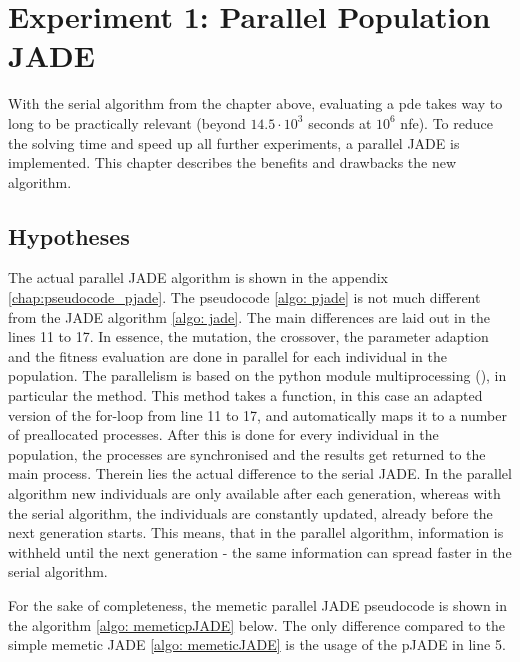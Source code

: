 \documentclass[./\jobname.tex]{subfiles}
\begin{document}
\chapter {Experiment 1: Parallel Population JADE}
\label{chap:experimet_1}

With the serial algorithm from the chapter above, evaluating a \gls{pde} takes way to long to be practically relevant (beyond $14.5 \cdot 10^3$ seconds at $10^6$ \gls{nfe}). To reduce the solving time and speed up all further experiments, a parallel JADE is implemented. This chapter describes the benefits and drawbacks the new algorithm.  

\section{Hypotheses}
The actual parallel JADE algorithm is shown in the appendix \ref{chap:pseudocode_pjade}. The pseudocode \ref{algo: pjade} is not much different from the JADE algorithm \ref{algo: jade}. The main differences are laid out in the lines 11 to 17. In essence, the mutation, the crossover, the parameter adaption and the fitness evaluation are done in parallel for each individual in the population. The parallelism is based on the python module multiprocessing (\cite{python_standard_library_multiprocessing_2020}), in particular the  method. This method takes a function, in this case an adapted version of the for-loop from line 11 to 17, and automatically maps it to a number of preallocated processes. After this is done for every individual in the population, the processes are synchronised and the results get returned to the main process. Therein lies the actual difference to the serial JADE. In the parallel algorithm new individuals are only available after each generation, whereas with the serial algorithm, the individuals are constantly updated, already before the next generation starts. This means, that in the parallel algorithm, information is withheld until the next generation - the same information can spread faster in the serial algorithm.  

For the sake of completeness, the memetic parallel JADE pseudocode is shown in the algorithm \ref{algo: memeticpJADE} below. The only difference compared to the simple memetic JADE \ref{algo: memeticJADE} is the usage of the pJADE in line 5. 

\begin{algorithm}[h]
	\SetAlgoNoLine
	\DontPrintSemicolon
	\label{algo: memeticpJADE}
\end{algorithm}
\end{document}
